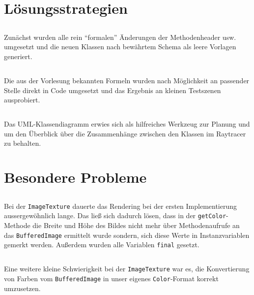 \documentclass[11pt]{amsart}
\begin{document}
\section{L\"osungsstrategien}
\subsection{}
Zun\"achst wurden alle rein "`formalen"' \"Anderungen der Methodenheader usw. umgesetzt und die neuen Klassen nach 
bew\"ahrtem Schema als leere Vorlagen generiert.

\subsection{}
Die aus der Vorlesung bekannten Formeln wurden nach M\"oglichkeit an passender Stelle direkt in Code umgesetzt und das 
Ergebnis an kleinen Testszenen ausprobiert.

\subsection{}
Das UML-Klassendiagramm erwies sich als hilfreiches Werkzeug zur Planung und um den \"Uberblick \"uber die 
Zusammenh\"ange zwischen den Klassen im Raytracer zu behalten.



\section{Besondere Probleme}
\subsection{}
Bei der \texttt{ImageTexture} dauerte das Rendering bei der ersten Implementierung aussergew\"ohnlich lange. Das 
lie\ss{} sich dadurch l\"osen, dass in der \texttt{getColor}-Methode die Breite und H\"ohe des Bildes nicht mehr \"uber 
Methodenaufrufe an das \texttt{BufferedImage} ermittelt wurde sondern, sich diese Werte in Instanzvariablen gemerkt 
werden. Au\ss{}erdem wurden alle Variablen \texttt{final} gesetzt.

\subsection{}
Eine weitere kleine Schwierigkeit bei der \texttt{ImageTexture} war es, die Konvertierung von Farben vom 
\texttt{BufferedImage} in unser eigenes \texttt{Color}-Format korrekt umzusetzen.
\end{document}
